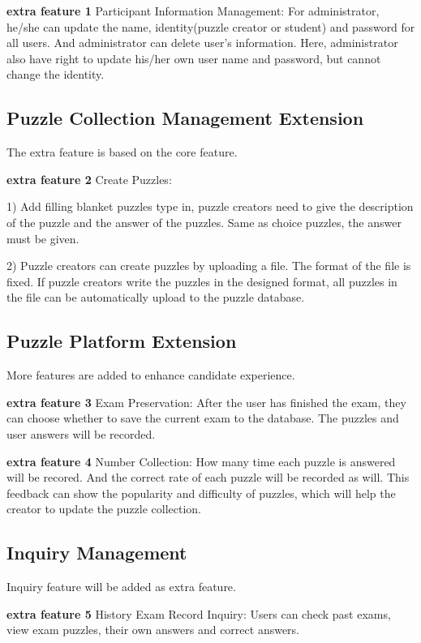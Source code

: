 \documentclass{article}
\begin{document}
 \textbf{extra feature 1} Participant Information Management:
For administrator, he/she can update the name, identity(puzzle creator or student) and password for all users. And administrator can delete user’s information. Here, administrator also have right to update his/her own user name and password, but cannot change the identity.

\subsection{Puzzle Collection Management Extension}

The extra feature is based on the core feature.

 \textbf{extra feature 2} Create Puzzles:


1) Add filling blanket puzzles type in, puzzle creators need to give the description of the puzzle and the answer of the puzzles. Same as choice puzzles, the answer must be given.

2) Puzzle creators can create puzzles by uploading a file. The format of the file is fixed. If puzzle creators write the puzzles in the designed format, all puzzles in the file can be automatically upload to the puzzle database.


\subsection{Puzzle Platform Extension}

More features are added to enhance candidate experience. 

 \textbf{extra feature 3} Exam Preservation: After the user has finished the exam, they can choose whether to save the current exam to the database. The puzzles and user answers will be recorded.
 
 \textbf{extra feature 4} Number Collection: How many time each puzzle is answered will be recored. And the correct rate of each puzzle will be recorded as will. This feedback can show the popularity and difficulty of puzzles, which will help the creator to update the puzzle collection.

\subsection{Inquiry Management}

Inquiry feature will be added as extra feature.

 \textbf{extra feature 5} History Exam Record Inquiry: Users can check past exams, view exam puzzles, their own answers and correct answers.



\end{document}

